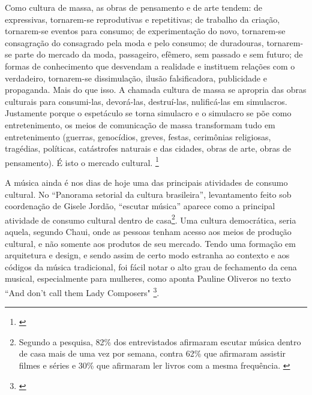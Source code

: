 \begin{citacao}

Como cultura de massa, as obras de pensamento e de arte tendem: de expressivas, tornarem-se reprodutivas e repetitivas; de trabalho da criação, tornarem-se eventos para consumo; de experimentação do novo, tornarem-se consagração do consagrado pela moda e pelo consumo; de duradouras, tornarem-se parte do mercado da moda, passageiro, efêmero, sem passado e sem futuro; de formas de conhecimento que desvendam a realidade e instituem relações com o verdadeiro, tornarem-se dissimulação, ilusão falsificadora, publicidade e propaganda. Mais do que isso. A chamada cultura de massa se apropria das obras culturais para consumi-las, devorá-las, destruí-las, nulificá-las em simulacros. Justamente porque o espetáculo se torna simulacro e o simulacro se põe como entretenimento, os meios de comunicação de massa transformam tudo em entretenimento (guerras, genocídios, greves, festas, cerimônias religiosas, tragédias, políticas, catástrofes naturais e das cidades, obras de arte, obras de pensamento). É isto o mercado cultural. \footnote{\cite[61]{MarilenaChaui2008}}
\end{citacao}

 A música ainda é nos dias de hoje uma das principais atividades de consumo cultural. No ``Panorama setorial da cultura brasileira'', levantamento feito sob coordenação de Gisele Jordão, ``escutar música'' aparece como a principal atividade de consumo cultural dentro de casa\footnote{Segundo a pesquisa, 82\% dos entrevistados afirmaram escutar música dentro de casa mais de uma vez por semana, contra 62\% que afirmaram assistir filmes e séries e 30\% que afirmaram ler livros com a mesma frequência. \cite[52]{Jordao2018}}. Uma cultura democrática, seria aquela, segundo Chaui, onde as pessoas tenham acesso aos meios de produção cultural, e não somente aos produtos de seu mercado. Tendo uma formação em arquitetura e design, e sendo assim de certo modo estranha ao contexto e aos códigos da música tradicional, foi fácil notar o alto grau de fechamento da cena musical, especialmente para mulheres, como aponta Pauline Oliveros no texto ``And don't call them Lady Composers" \footnote{\cite[48]{Oliveros2012}}. 


